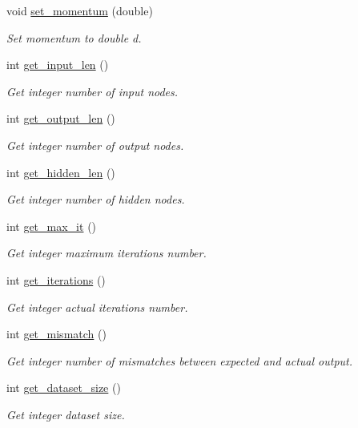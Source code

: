 \begin{DoxyCompactItemize}
void \hyperlink{a00003_af198ad4aa200b431aa45fc17a3895438}{set\-\_\-momentum} (double)
\begin{DoxyCompactList}\small\item\em Set momentum to double d. \end{DoxyCompactList}\item 
int \hyperlink{a00003_a75e25e607afb4e862219b21c0569c893}{get\-\_\-input\-\_\-len} ()
\begin{DoxyCompactList}\small\item\em Get integer number of input nodes. \end{DoxyCompactList}\item 
int \hyperlink{a00003_a895c1b35110b7ee5e5adc56a63a55e78}{get\-\_\-output\-\_\-len} ()
\begin{DoxyCompactList}\small\item\em Get integer number of output nodes. \end{DoxyCompactList}\item 
int \hyperlink{a00003_ac781308fb521309d657b91a95054be52}{get\-\_\-hidden\-\_\-len} ()
\begin{DoxyCompactList}\small\item\em Get integer number of hidden nodes. \end{DoxyCompactList}\item 
int \hyperlink{a00003_aab60f50cc87dc0b740bd843790cf520d}{get\-\_\-max\-\_\-it} ()
\begin{DoxyCompactList}\small\item\em Get integer maximum iterations number. \end{DoxyCompactList}\item 
int \hyperlink{a00003_aacf2daec15b81c80a817b9102655a205}{get\-\_\-iterations} ()
\begin{DoxyCompactList}\small\item\em Get integer actual iterations number. \end{DoxyCompactList}\item 
int \hyperlink{a00003_add6473ba7b95c86fb88ec81610861075}{get\-\_\-mismatch} ()
\begin{DoxyCompactList}\small\item\em Get integer number of mismatches between expected and actual output. \end{DoxyCompactList}\item 
int \hyperlink{a00003_a5d2f56c6fa9c9dc72db252653469f4cc}{get\-\_\-dataset\-\_\-size} ()
\begin{DoxyCompactList}\small\item\em Get integer dataset size. \end{DoxyCompactList}\item 

\end{DoxyCompactItemize}
